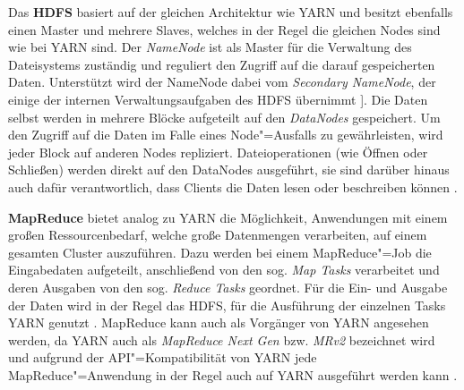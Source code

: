 Das \textbf{\ac{HDFS}} basiert auf der gleichen Architektur wie YARN und besitzt ebenfalls einen Master und mehrere Slaves, welches in der Regel die gleichen Nodes sind wie bei YARN sind.
Der \emph{NameNode} ist als Master für die Verwaltung des Dateisystems zuständig und reguliert den Zugriff auf die darauf gespeicherten Daten.
Unterstützt wird der NameNode dabei vom \emph{Secondary NameNode}, der einige der internen Verwaltungsaufgaben des \ac{HDFS} übernimmt \cite{HadoopHdfsGuide271}].
Die Daten selbst werden in mehrere Blöcke aufgeteilt auf den \emph{DataNodes} gespeichert.
Um den Zugriff auf die Daten im Falle eines Node"=Ausfalls zu gewährleisten, wird jeder Block auf anderen Nodes repliziert.
Dateioperationen (wie Öffnen oder Schließen) werden direkt auf den DataNodes ausgeführt, sie sind darüber hinaus auch dafür verantwortlich, dass Clients die Daten lesen oder beschreiben können \cite{HadoopHdfsDesc271}.

\textbf{MapReduce} bietet analog zu YARN die Möglichkeit, Anwendungen mit einem großen Ressourcenbedarf, welche große Datenmengen verarbeiten, auf einem gesamten Cluster auszuführen.
Dazu werden bei einem MapReduce"=Job die Eingabedaten aufgeteilt, anschließend von den sog. \emph{Map Tasks} verarbeitet und deren Ausgaben von den sog. \emph{Reduce Tasks} geordnet.
Für die Ein- und Ausgabe der Daten wird in der Regel das \acs{HDFS}, für die Ausführung der einzelnen Tasks YARN genutzt \cite{HadoopMapRedTutorial271}.
MapReduce kann auch als Vorgänger von YARN angesehen werden, da YARN auch als \emph{MapReduce Next Gen} bzw. \emph{MRv2} bezeichnet wird und aufgrund der API"=Kompatibilität von YARN jede MapReduce"=Anwendung in der Regel auch auf YARN ausgeführt werden kann \cite{HadoopYarnArch271,HadoopYarnOverview271}.

